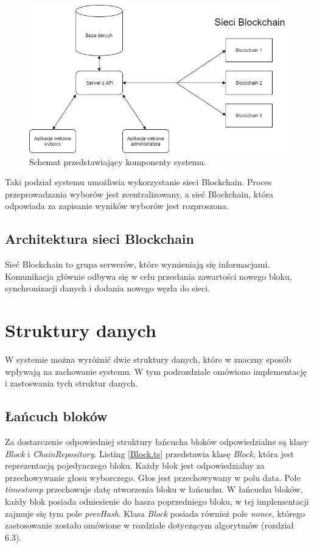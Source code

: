\documentclass[a4paper,12pt]{book}
\begin{document}
\begin{figure}[h]
    	\centering
	\includegraphics[width=\textwidth]{images/modules.png}
	\caption{Schemat przedstawiający komponenty systemu.}\label{komponenty}
\end {figure}

Taki podział systemu umożliwia wykorzystanie sieci Blockchain. Proces przeprowadzania wyborów jest zcentralizowany, a sieć Blockchain, która odpowiada za zapisanie wyników wyborów jest rozproszona.

\subsection{Architektura sieci Blockchain}

Sieć Blockchain to grupa serwerów, które wymieniają się informacjami. Komunikacja głównie odbywa się w celu przesłania zawartości nowego bloku, synchronizacji danych i dodania nowego węzła do sieci.

\section{Struktury danych}

W systemie można wyróżnić dwie struktury danych, które w znaczny sposób wpływają na zachowanie systemu. W tym podrozdziale omówiono implementację i zastoswania tych struktur danych.

\subsection{Łańcuch bloków}

Za dostarczenie odpowiedniej struktury łańcucha bloków odpowiedzialne są klasy \textit{Block} i \textit{ChainRepository}. Listing \ref{Block.ts} przedstawia klasę \textit{Block}, która jest reprezentacją pojedynczego bloku. Każdy blok jest odpowiedzialny za przechowywanie głosu wyborczego. Głos jest przechowywany w polu data. Pole \textit{timestamp} przechowuje datę utworzenia bloku w łańcuchu. W łańcuchu bloków, każdy blok posiada odniesienie do hasza poprzedniego bloku, w tej implementacji zajmuje się tym pole \textit{prevHash}. Klasa \textit{Block} posiada również pole \textit{nonce}, którego zastosowanie zostało omówione w rozdziale dotyczącym algorytmów (rozdział 6.3).
\end{document}
